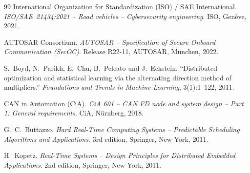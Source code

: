 ﻿\documentclass[a4paper,12pt]{article}
\theoremstyle{definition}
\begin{document}
\begin{thebibliography}{99}
International Organization for Standardization (ISO) / SAE International.
\emph{ISO/SAE~21434:2021 -- Road vehicles -- Cybersecurity engineering}.
ISO, Gen\`{e}ve, 2021.

AUTOSAR Consortium.
\emph{AUTOSAR -- Specification of Secure Onboard Communication (SecOC)}.
Release R22-11, AUTOSAR, M\"{u}nchen, 2022.

S.~Boyd, N.~Parikh, E.~Chu, B.~Peleato und J.~Eckstein.
``Distributed optimization and statistical learning via the alternating direction
method of multipliers.''
\emph{Foundations and Trends in Machine Learning}, 3(1):1--122, 2011.

CAN in Automation (CiA).
\emph{CiA 601 -- CAN FD node and system design -- Part 1: General requirements}.
CiA, N\"{u}rnberg, 2018.

G.~C.~Buttazzo.
\emph{Hard Real-Time Computing Systems -- Predictable Scheduling Algorithms and
Applications}.
3rd edition, Springer, New York, 2011.

H.~Kopetz.
\emph{Real-Time Systems -- Design Principles for Distributed Embedded Applications}.
2nd edition, Springer, New York, 2011.

\end{thebibliography}
\end{document}
